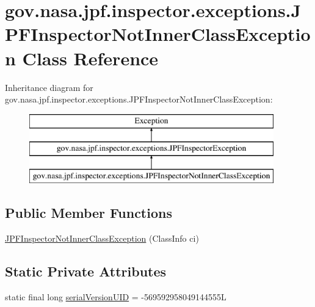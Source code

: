 \hypertarget{classgov_1_1nasa_1_1jpf_1_1inspector_1_1exceptions_1_1_j_p_f_inspector_not_inner_class_exception}{}\section{gov.\+nasa.\+jpf.\+inspector.\+exceptions.\+J\+P\+F\+Inspector\+Not\+Inner\+Class\+Exception Class Reference}
\label{classgov_1_1nasa_1_1jpf_1_1inspector_1_1exceptions_1_1_j_p_f_inspector_not_inner_class_exception}
Inheritance diagram for gov.\+nasa.\+jpf.\+inspector.\+exceptions.\+J\+P\+F\+Inspector\+Not\+Inner\+Class\+Exception\+:\begin{figure}[H]
\begin{center}
\leavevmode
\includegraphics[height=3.000000cm]{classgov_1_1nasa_1_1jpf_1_1inspector_1_1exceptions_1_1_j_p_f_inspector_not_inner_class_exception}
\end{center}
\end{figure}
\subsection*{Public Member Functions}
\begin{DoxyCompactItemize}
\item 
\hyperlink{classgov_1_1nasa_1_1jpf_1_1inspector_1_1exceptions_1_1_j_p_f_inspector_not_inner_class_exception_ae7c47377f9545c2550688cd62db2014a}{J\+P\+F\+Inspector\+Not\+Inner\+Class\+Exception} (Class\+Info ci)
\end{DoxyCompactItemize}
\subsection*{Static Private Attributes}
\begin{DoxyCompactItemize}
\item 
static final long \hyperlink{classgov_1_1nasa_1_1jpf_1_1inspector_1_1exceptions_1_1_j_p_f_inspector_not_inner_class_exception_a1d488cbbba8b6e58ff4a3b7c46a7f2a5}{serial\+Version\+U\+ID} = -\/569592958049144555L
\end{DoxyCompactItemize}


